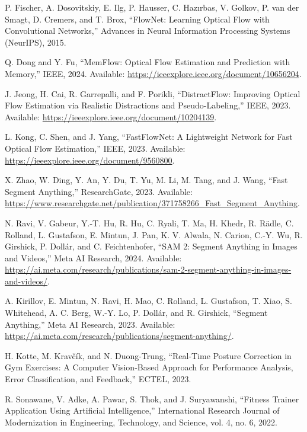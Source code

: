 \documentclass[conference]{IEEEtran}
\begin{document}
\begin{thebibliography}{00}
 P. Fischer, A. Dosovitskiy, E. Ilg, P. Hausser, C. Hazırbas, V. Golkov, P. van der Smagt, D. Cremers, and T. Brox, ``FlowNet: Learning Optical Flow with Convolutional Networks,'' Advances in Neural Information Processing Systems (NeurIPS), 2015.

 Q. Dong and Y. Fu, ``MemFlow: Optical Flow Estimation and Prediction with Memory,'' IEEE, 2024. Available: \url{https://ieeexplore.ieee.org/document/10656204}.

 J. Jeong, H. Cai, R. Garrepalli, and F. Porikli, ``DistractFlow: Improving Optical Flow Estimation via Realistic Distractions and Pseudo-Labeling,'' IEEE, 2023. Available: \url{https://ieeexplore.ieee.org/document/10204139}.

 L. Kong, C. Shen, and J. Yang, ``FastFlowNet: A Lightweight Network for Fast Optical Flow Estimation,'' IEEE, 2023. Available: \url{https://ieeexplore.ieee.org/document/9560800}.

 X. Zhao, W. Ding, Y. An, Y. Du, T. Yu, M. Li, M. Tang, and J. Wang, ``Fast Segment Anything,'' ResearchGate, 2023. Available: \url{https://www.researchgate.net/publication/371758266_Fast_Segment_Anything}.

 N. Ravi, V. Gabeur, Y.-T. Hu, R. Hu, C. Ryali, T. Ma, H. Khedr, R. Rädle, C. Rolland, L. Gustafson, E. Mintun, J. Pan, K. V. Alwala, N. Carion, C.-Y. Wu, R. Girshick, P. Dollár, and C. Feichtenhofer, ``SAM 2: Segment Anything in Images and Videos,'' Meta AI Research, 2024. Available: \url{https://ai.meta.com/research/publications/sam-2-segment-anything-in-images-and-videos/}.

 A. Kirillov, E. Mintun, N. Ravi, H. Mao, C. Rolland, L. Gustafson, T. Xiao, S. Whitehead, A. C. Berg, W.-Y. Lo, P. Dollár, and R. Girshick, ``Segment Anything,'' Meta AI Research, 2023. Available: \url{https://ai.meta.com/research/publications/segment-anything/}.

 H. Kotte, M. Kravčík, and N. Duong-Trung, ``Real-Time Posture Correction in Gym Exercises: A Computer Vision-Based Approach for Performance Analysis, Error Classification, and Feedback,'' ECTEL, 2023.

 R. Sonawane, V. Adke, A. Pawar, S. Thok, and J. Suryawanshi, ``Fitness Trainer Application Using Artificial Intelligence,'' International Research Journal of Modernization in Engineering, Technology, and Science, vol. 4, no. 6, 2022.
\end{thebibliography}
\end{document}
